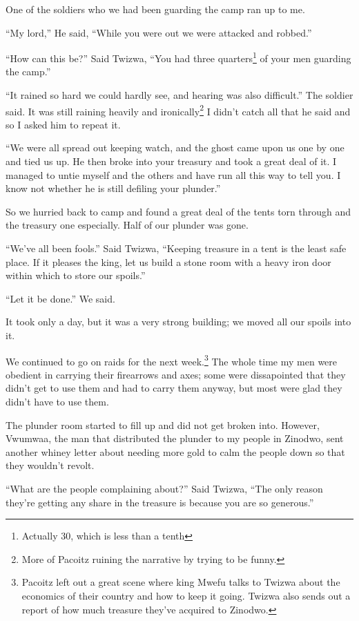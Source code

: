 One of the soldiers who we had been guarding the camp ran up to me.

``My lord,'' He said, ``While you were out we were attacked and robbed.''

``How can this be?'' Said Twi\-zwa, ``You had three quarters\footnote{Actually 30, which is less than a tenth} of your men guarding the camp.''

``It rained so hard we could hardly see, and hearing was also difficult.'' The soldier said. It was still raining heavily and ironically\footnote{More of Pa\-co\-itz ruining the narrative by trying to be funny.} I didn't catch all that he said and so I asked him to repeat it.

``We were all spread out keeping watch, and the ghost came upon us one by one and tied us up. He then broke into your treasury and took a great deal of it. I managed to untie myself and the others and have run all this way to tell you. I know not whether he is still defiling your plunder.''

So we hurried back to camp and found a great deal of the tents torn through and the treasury one especially. Half of our plunder was gone.

``We've all been fools.'' Said Twi\-zwa, ``Keeping treasure in a tent is the least safe place. If it pleases the king, let us build a stone room with a heavy iron door within which to store our spoils.''

``Let it be done.'' We said.

It took only a day, but it was a very strong building; we moved all our spoils into it.

\tbreak

We continued to go on raids for the next week.\footnote{Pa\-co\-itz left out a great scene where king Mwe\-fu talks to Twi\-zwa about the economics of their country and how to keep it going. Twi\-zwa also sends out a report of how much treasure they've acquired to Zi\-no\-dwo.} The whole time my men were obedient in carrying their firearrows and axes; some were dissapointed that they didn't get to use them and had to carry them anyway, but most were glad they didn't have to use them.

The plunder room started to fill up and did not get broken into. However, Vwu\-mwaa, the man that distributed the plunder to my people in Zi\-no\-dwo, sent another whiney letter about needing more gold to calm the people down so that they wouldn't revolt.

``What are the people complaining about?'' Said Twi\-zwa, ``The only reason they're getting any share in the treasure is because you are so generous.''

